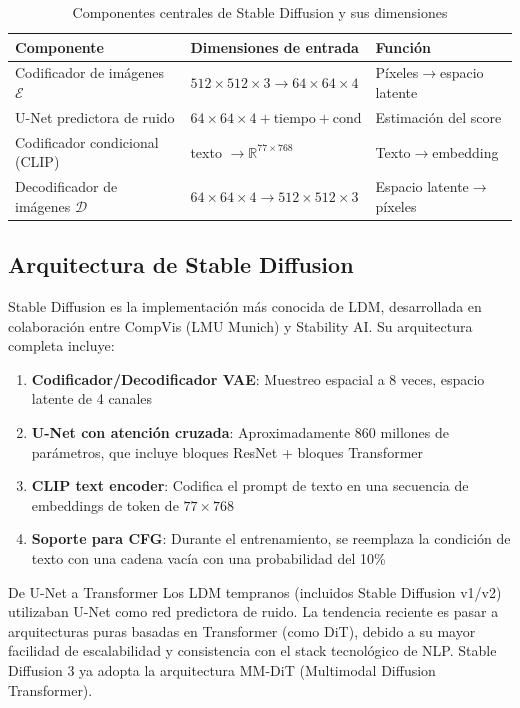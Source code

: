\documentclass[a4paper]{article}
\begin{document}
\begin{table}[H]
\centering
\begin{tabular}{lll}
\toprule
\textbf{Componente} & \textbf{Dimensiones de entrada} & \textbf{Función} \\
\midrule
Codificador de imágenes $\mathcal{E}$ & $512\times512\times3 \to 64\times64\times4$ & Píxeles$\to$espacio latente \\
U-Net predictora de ruido & $64\times64\times4 + \text{tiempo} + \text{cond}$ & Estimación del score \\
Codificador condicional (CLIP) & texto $\to \mathbb{R}^{77\times768}$ & Texto$\to$embedding \\
Decodificador de imágenes $\mathcal{D}$ & $64\times64\times4 \to 512\times512\times3$ & Espacio latente$\to$píxeles \\
\bottomrule
\end{tabular}
\caption{Componentes centrales de Stable Diffusion y sus dimensiones}
\end{table}

\subsection{Arquitectura de Stable Diffusion}

Stable Diffusion es la implementación más conocida de LDM, desarrollada en colaboración entre CompVis (LMU Munich) y Stability AI. Su arquitectura completa incluye:

\begin{enumerate}
    \item \textbf{Codificador/Decodificador VAE}: Muestreo espacial a 8 veces, espacio latente de 4 canales
    \item \textbf{U-Net con atención cruzada}: Aproximadamente 860 millones de parámetros, que incluye bloques ResNet + bloques Transformer
    \item \textbf{CLIP text encoder}: Codifica el prompt de texto en una secuencia de embeddings de token de $77\times768$
    \item \textbf{Soporte para CFG}: Durante el entrenamiento, se reemplaza la condición de texto con una cadena vacía con una probabilidad del 10\%
\end{enumerate}

\begin{knowledgebox}{De U-Net a Transformer}
Los LDM tempranos (incluidos Stable Diffusion v1/v2) utilizaban U-Net como red predictora de ruido. La tendencia reciente es pasar a arquitecturas puras basadas en Transformer (como DiT), debido a su mayor facilidad de escalabilidad y consistencia con el stack tecnológico de NLP. Stable Diffusion 3 ya adopta la arquitectura MM-DiT (Multimodal Diffusion Transformer).
\end{knowledgebox}
\end{document}
